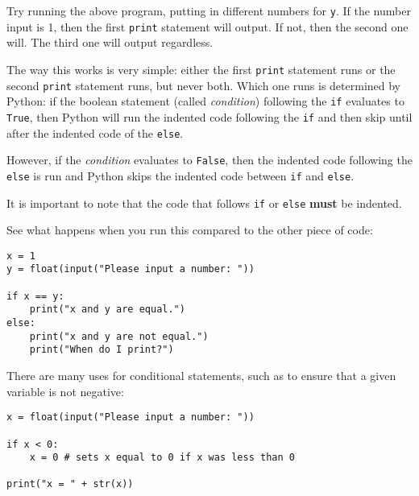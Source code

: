 \documentclass[11pt,hidelinks]{article}
\begin{document}
Try running the above program, putting in different numbers for \lstinline{y}.
If the number input is 1, then the first \lstinline!print! statement will
output. If not, then the second one will. The third one will output regardless.

The way this works is very simple: either the first \lstinline!print! statement
runs or the second \lstinline!print! statement runs, but never both. Which one
runs is determined by Python: if the boolean statement (called \emph{condition})
following the \lstinline!if! evaluates to \lstinline!True!, then Python will
run the indented code following the \lstinline!if! and then skip until after
the indented code of the \lstinline!else!.

However, if the \emph{condition} evaluates to \lstinline!False!, then the
indented code following the \lstinline!else! is run and Python skips the
indented code between \lstinline!if! and \lstinline!else!.

It is important to note that the code that follows \lstinline!if! or
\lstinline!else! \textbf{must} be indented.

See what happens when you run this compared to the other piece of code:
\begin{lstlisting}
x = 1
y = float(input("Please input a number: "))

if x == y:
    print("x and y are equal.")
else:
    print("x and y are not equal.")
    print("When do I print?")
\end{lstlisting}


There are many uses for conditional statements, such as to ensure that a given
variable is not negative:

\begin{lstlisting}[style=python]
x = float(input("Please input a number: "))

if x < 0:
    x = 0 # sets x equal to 0 if x was less than 0

print("x = " + str(x))
\end{lstlisting}
\end{document}

